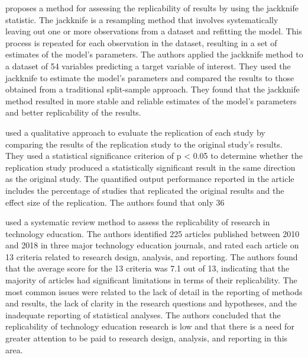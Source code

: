 \documentclass[12pt, a4paper, twocolumn]{article}
\begin{document}
			\citet{Ang1998Evaluate}proposes a method for assessing the replicability of results by using the jackknife statistic. The jackknife is a resampling method that involves systematically leaving out one or more observations from a dataset and refitting the model. This process is repeated for each observation in the dataset, resulting in a set of estimates of the model's parameters. The authors applied the jackknife method to a dataset of 54 variables predicting a target variable of interest. They used the jackknife to estimate the model's parameters and compared the results to those obtained from a traditional split-sample approach. They found that the jackknife method resulted in more stable and reliable estimates of the model's parameters and better replicability of the results.

			\citet{Thompson2006} used a qualitative approach to evaluate the replication of each study by comparing the results of the replication study to the original study's results. They used a statistical significance criterion of p < 0.05 to determine whether the replication study produced a statistically significant result in the same direction as the original study. The quantified output performance reported in the article includes the percentage of studies that replicated the original results and the effect size of the replication. The authors found that only 36%

			\citet{Estimatingthereplicability} used a systematic review method to assess the replicability of research in technology education. The authors identified 225 articles published between 2010 and 2018 in three major technology education journals, and rated each article on 13 criteria related to research design, analysis, and reporting. The authors found that the average score for the 13 criteria was 7.1 out of 13, indicating that the majority of articles had significant limitations in terms of their replicability. The most common issues were related to the lack of detail in the reporting of methods and results, the lack of clarity in the research questions and hypotheses, and the inadequate reporting of statistical analyses. The authors concluded that the replicability of technology education research is low and that there is a need for greater attention to be paid to research design, analysis, and reporting in this area.
\end{document}
